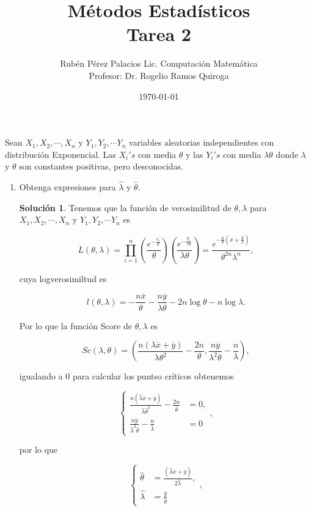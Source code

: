 \documentclass[letterpaper]{article}
\title{Métodos Estadísticos \\ Tarea 2}
\author{Rubén Pérez Palacios Lic. Computación Matemática\\Profesor: Dr. Rogelio Ramos Quiroga}
\date{\today}
\theoremstyle{definition}
\theoremstyle{lemathm}
\theoremstyle{lemathm}
\newtheorem{sol}{Solución}
\theoremstyle{lemathm}
\theoremstyle{lemademthm}
\newcommand{\txty}{\text{ y }}
\newcommand{\pars}[1]{\left( #1 \right) }
\newcommand{\1}{\mathbbm{1}}
\begin{document}
	\maketitle
	
	Sean $X_1,X_2,\cdots,X_n$ y $Y_1,Y_2,\cdots Y_n$ variables aleatorias independientes con distribución Exponencial. Las $X_i's$ con media $\theta$ y las $Y_i's$ con media $\lambda\theta$ donde $\lambda$ y $\theta$ son constantes positivas, pero desconocidas.

	\begin{enumerate}
		\item Obtenga expresiones para $\hat{\lambda} \txty \hat{\theta}$.
		
		\begin{sol}
			Tenemos que la función de verosimilitud de $\theta,\lambda$ para $X_1,X_2,\cdots,X_n$ y $Y_1,Y_2,\cdots Y_n$ es

			\[L\pars{\theta, \lambda} = \prod_{i=1}^n \pars{\frac{e^{-\frac{x_i}{\theta}}}{\theta}}\pars{\frac{e^{-\frac{y_1}{\lambda\theta}}}{\lambda\theta}} = \frac{e^{-\frac{n}{\theta}\pars{\overline{x}+\frac{\overline{y}}{\lambda}}}}{\theta^{2n}\lambda^n},\]

			cuya logverosimiltud es

			\[l\pars{\theta, \lambda} = - \frac{n\overline{x}}{\theta} - \frac{n\overline{y}}{\lambda\theta} - 2n\log{\theta} - n\log{\lambda}.\]

			Por lo que la función Score de $\theta,\lambda$ es

			\[Sc\pars{\lambda,\theta} = \pars{\frac{n\pars{\lambda\overline{x} + \overline{y}}}{\lambda\theta^2} - \frac{2n}{\theta}, \frac{n\overline{y}}{\lambda^2\theta} - \frac{n}{\lambda}},\]

			igualando a $0$ para calcular los puntso críticos obtenemos

			\[\begin{cases}
				\frac{n\pars{\hat{\lambda}\overline{x} + \overline{y}}}{\hat{\lambda}\hat{\theta}^2} - \frac{2n}{\hat{\theta}} &= 0,\\[1ex]
				\frac{n\overline{y}}{\hat{\lambda}^2\hat{\theta}} - \frac{n}{\hat{\lambda}} &= 0
			\end{cases},\]

			por lo que

			\[\begin{cases}
				\hat{\theta} &= \frac{\pars{\hat{\lambda}\overline{x} + \overline{y}}}{2\hat{\lambda}},\\[1ex]
				\hat{\lambda} &= \frac{\overline{y}}{\hat{\theta}}
			\end{cases},\]


\end{sol}
\end{enumerate}
\end{document}
